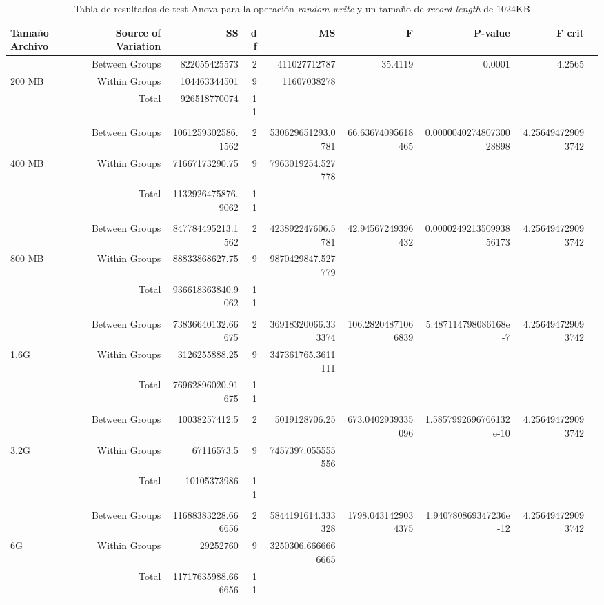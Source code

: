 \begin{landscape}
\begin{table}[!htp]\centering
\caption{Tabla de resultados de test Anova para la operación \textit{random write} y un tamaño de \textit{record length} de 1024KB}\label{tab: }
\scriptsize
\begin{tabular}{lrrrrrrrr}\toprule
Tamaño Archivo &Source of Variation &SS &df &MS &F &P-value &F crit \\\midrule
&Between Groups &822055425573 &2 &411027712787 &35.4119 &0.0001 &4.2565 \\
200 MB &Within Groups &104463344501 &9 &11607038278 & & & \\
&Total &926518770074 &11 & & & & \\
& & & & & & & \\
&Between Groups &1061259302586.1562 &2 &530629651293.0781 &66.63674095618465 &0.000004027480730028898 &4.256494729093742 \\
400 MB &Within Groups &71667173290.75 &9 &7963019254.527778 & & & \\
&Total &1132926475876.9062 &11 & & & & \\
& & & & & & & \\
&Between Groups &847784495213.1562 &2 &423892247606.5781 &42.94567249396432 &0.000024921350993856173 &4.256494729093742 \\
800 MB &Within Groups &88833868627.75 &9 &9870429847.527779 & & & \\
&Total &936618363840.9062 &11 & & & & \\
& & & & & & & \\
&Between Groups &73836640132.66675 &2 &36918320066.333374 &106.28204871066839 &5.487114798086168e-7 &4.256494729093742 \\
1.6G &Within Groups &3126255888.25 &9 &347361765.3611111 & & & \\
&Total &76962896020.91675 &11 & & & & \\
& & & & & & & \\
&Between Groups &10038257412.5 &2 &5019128706.25 &673.0402939335096 &1.5857992696766132e-10 &4.256494729093742 \\
3.2G &Within Groups &67116573.5 &9 &7457397.055555556 & & & \\
&Total &10105373986 &11 & & & & \\
& & & & & & & \\
&Between Groups &11688383228.666656 &2 &5844191614.333328 &1798.0431429034375 &1.940780869347236e-12 &4.256494729093742 \\
6G &Within Groups &29252760 &9 &3250306.6666666665 & & & \\
&Total &11717635988.666656 &11 & & & & \\
\bottomrule
\end{tabular}
\end{table}
\end{landscape}



